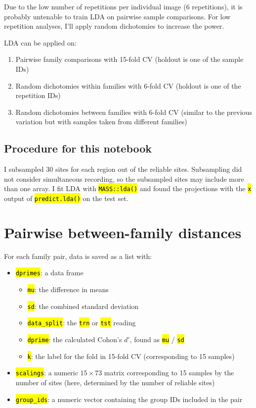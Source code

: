 \documentclass[
  10pt,
  letterpaper,
  DIV=11,
  numbers=noendperiod]{scrartcl}
\providecommand{\tightlist}{%
  \setlength{\itemsep}{0pt}\setlength{\parskip}{0pt}}
\let\OldTexttt\texttt
\renewcommand{\texttt}[1]{\OldTexttt{\hl{#1}}}
\begin{document}
Due to the low number of repetitions per individual image (6
repetitions), it is probably untenable to train LDA on pairwise sample
comparisons. For low repetition analyses, I'll apply random dichotomies
to increase the power.

LDA can be applied on:

\begin{enumerate}
\def\labelenumi{\arabic{enumi}.}
\tightlist
\item
  Pairwise family comparisons with 15-fold CV (holdout is one of the
  sample IDs)
\item
  Random dichotomies within families with 6-fold CV (holdout is one of
  the repetition IDs)
\item
  Random dichotomies between families with 6-fold CV (similar to the
  previous variation but with samples taken from different families)
\end{enumerate}

\subsection{Procedure for this
notebook}\label{procedure-for-this-notebook}

I subsampled 30 sites for each region out of the reliable sites.
Subsampling did not consider simultaneous recording, so the subsampled
sites may include more than one array. I fit LDA with
\texttt{MASS::lda()} and found the projections with the \texttt{x}
output of \texttt{predict.lda()} on the test set.

\section{Pairwise between-family
distances}\label{pairwise-between-family-distances}

For each family pair, data is saved as a list with:

\begin{itemize}
\tightlist
\item
  \texttt{dprimes}: a data frame

  \begin{itemize}
  \tightlist
  \item
    \texttt{mu}: the difference in means
  \item
    \texttt{sd}: the combined standard deviation
  \item
    \texttt{data\_split}: the \texttt{trn} or \texttt{tst} reading
  \item
    \texttt{dprime}: the calculated Cohon's \(d'\), found as \texttt{mu}
    / \texttt{sd}
  \item
    \texttt{k}: the label for the fold in 15-fold CV (corresponding to
    15 samples)
  \end{itemize}
\item
  \texttt{scalings}: a numeric \(15 \times 73\) matrix corresponding to
  15 samples by the number of sites (here, determined by the number of
  reliable sites)
\item
  \texttt{group\_ids}: a numeric vector containing the group IDs
  included in the pair
\end{itemize}
\end{document}
